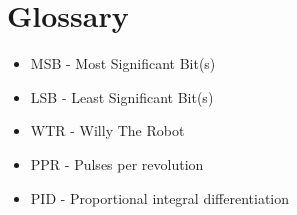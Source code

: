 \section{Glossary}
\begin{itemize}
\item \label{trm::MSB} MSB  - Most Significant Bit(s)
\item \label{trm::LSB} LSB  - Least Significant Bit(s)
\item \label{trm::WTR} WTR  - Willy The Robot
\item \label{trm::PPR} PPR - Pulses per revolution
\item \label{trm::PID} PID - Proportional integral differentiation
\end{itemize}